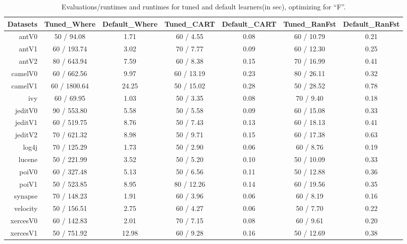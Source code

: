 \documentclass{sig-alternative}
\begin{document}
\begin{table}[!ht]
\renewcommand{\baselinestretch}{0.75}
\scriptsize
\centering
  \begin{tabular}{r|c |c |c |c |c |c } 
    Datasets & Tuned\_Where & Default\_Where & Tuned\_CART & Default\_CART & Tuned\_RanFst & Default\_RanFst\\
    \hline
    antV0 & 50 / 94.08 & 1.71 & 60 / 4.55 & 0.08 & 60 / 10.79 & 0.21\\
    antV1 & 60 / 193.74 & 3.02 & 70 / 7.77 & 0.09 & 60 / 12.30 & 0.25\\
    antV2 & 80 / 643.94 & 7.59 & 60 / 8.38 & 0.15 & 70 / 16.99 & 0.41\\
    camelV0 & 60 / 662.56 & 9.97 & 60 / 13.19 & 0.23 & 80 / 26.11 & 0.32\\
    camelV1 & 60 / 1800.64 & 24.25 & 50 / 15.02 & 0.28 & 50 / 28.52 & 0.78\\
    ivy & 60 / 69.95 & 1.03 & 50 / 3.35 & 0.08 & 70 / 9.40 & 0.18\\
    jeditV0 & 90 / 553.80 & 5.58 & 50 / 5.58 & 0.09 & 60 / 15.08 & 0.33\\
    jeditV1 & 60 / 519.75 & 8.76 & 50 / 7.43 & 0.13 & 60 / 18.13 & 0.41\\
    jeditV2 & 70 / 621.32 & 8.98 & 50 / 9.71 & 0.15 & 60 / 17.38 & 0.63\\
    log4j & 70 / 125.29 & 1.73 & 50 / 2.90 & 0.06 & 60 / 8.76 & 0.19\\
    lucene & 50 / 221.99 & 3.52 & 50 / 5.20 & 0.10 & 50 / 10.09 & 0.33\\
    poiV0 & 60 / 327.48 & 5.13 & 50 / 6.56 & 0.11 & 50 / 12.88 & 0.36\\
    poiV1 & 50 / 523.85 & 8.95 & 80 / 12.26 & 0.14 & 60 / 19.56 & 0.35\\
    synapse & 70 / 148.23 & 1.91 & 60 / 3.96 & 0.06 & 60 / 8.19 & 0.16\\
    velocity & 50 / 156.51 & 2.75 & 60 / 4.27 & 0.06 & 50 / 7.70 & 0.22\\
    xercesV0 & 60 / 142.83 & 2.01 & 70 / 7.15 & 0.08 & 60 / 9.61 & 0.20\\
    xercesV1 & 50 / 751.92 & 12.98 & 60 / 9.28 & 0.16 & 50 / 12.69 & 0.38\\

  \end{tabular}
  \caption{Evaluations/runtimes and runtimes for tuned and default learners(in sec), optimizing for  ``F''.  }\label{tab:ftimes}
\end{table}
\end{document}
